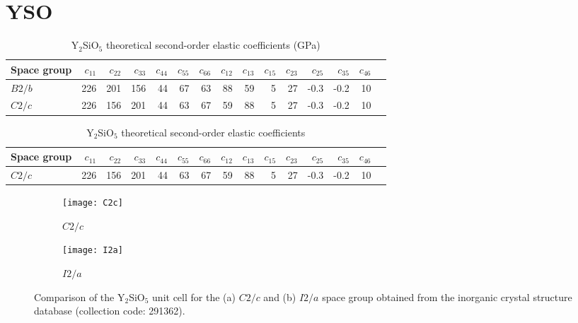 \chapter{YSO}

\begin{table}[h]
  \begin{center}
    \caption{Y$_{2}$SiO$_{5}$ theoretical second-order elastic coefficients (GPa)}
    \label{tab:elasticcoefficients}
    \begin{tabular}{l|r r r r r r r r r r r r r r} 
    \hline %
Space group & $c_{11}$ & $c_{22}$ & $c_{33}$ & $c_{44}$ & $c_{55}$ & $c_{66}$ & $c_{12}$ & $c_{13}$ & $c_{15}$ & $c_{23}$ & $c_{25}$ & $c_{35}$ & $c_{46}$ \\
       \hline
$B2/b$~\citep{doi:10.1111/jace.12764} & 226 & 201 & 156 & 44 & 67 & 63 & 88 & 59 & 5 & 27 & -0.3 & -0.2 & 10 \\ 
$C2/c$~\citep{Ceramics} & 226 & 156 & 201 & 44 & 63 & 67 & 59 & 88 & 5 & 27 & -0.3 & -0.2 & 10 \\
\hline
    \end{tabular}
  \end{center}
\end{table}

\begin{table}[h]
  \begin{center}
    \caption{Y$_{2}$SiO$_{5}$ theoretical second-order elastic coefficients}
    \label{tab:elasticcoefficients}
    \begin{tabular}{l|r r r r r r r r r r r r r r} 
    \hline %
Space group & $c_{11}$ & $c_{22}$ & $c_{33}$ & $c_{44}$ & $c_{55}$ & $c_{66}$ & $c_{12}$ & $c_{13}$ & $c_{15}$ & $c_{23}$ & $c_{25}$ & $c_{35}$ & $c_{46}$ \\
       \hline
$C2/c$ & 226 & 156 & 201 & 44 & 63 & 67 & 59 & 88 & 5 & 27 & -0.3 & -0.2 & 10 \\
\hline
    \end{tabular}
  \end{center}
\end{table}





\begin{figure}[H]
    \centering
    \begin{subfigure}[b]{0.487\textwidth}
        \centering
        \texttt{[image: C2c]}
        \caption{$C2/c$}
    \end{subfigure}
    \begin{subfigure}[b]{0.4\textwidth}
        \centering
        \texttt{[image: I2a]}
   \caption{$I2/a$}
   \end{subfigure}
    \caption{Comparison of the Y$_{2}$SiO$_{5}$ unit cell for the (a) $C2/c$ and (b) $I2/a$ space group obtained from the inorganic crystal structure database (collection code: 291362).}
\label{fig:crystalspacegroups}
\end{figure}

